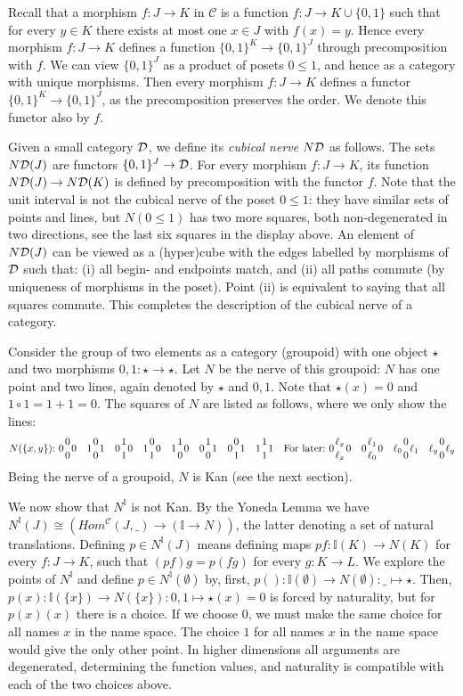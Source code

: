 \documentclass[10pt,a4paper]{article}
\newcommand{\CC}{{\mathcal C}}
\newcommand{\set}[1]{\{#1\}}
\newcommand{\interval}{\mathbb{I}}
\newcommand{\DD}{{\cal D}}
\newcommand{\ND}{N\DD}
\begin{document}
Recall that a morphism $f:J\to K$ in $\CC$ is a function $f:J\to
K\cup\set{0,1}$ such that for every $y\in K$ there exists at most one
$x\in J$ with $f(x)=y$.  Hence every morphism $f:J\to K$ defines a
function $\set{0,1}^K \to \set{0,1}^J$ through precomposition with
$f$.  We can view $\set{0,1}^J$ as a product of posets $0\leq1$, and
hence as a category with unique morphisms.  Then every morphism
$f:J\to K$ defines a functor $\set{0,1}^K \to \set{0,1}^J$, as the
precomposition preserves the order.  We denote this functor also by
$f$.

Given a small category $\DD$, we define its \emph{cubical nerve} $\ND$
as follows. The sets $\ND(J)$ are functors $\set{0,1}^J \to\DD$.  For
every morphism $f:J\to K$, its function $\ND(J)\to\ND(K)$ is defined
by precomposition with the functor $f$.  Note that the unit interval
is not the cubical nerve of the poset $0\leq1$: they have similar sets
of points and lines, but $N(0\leq1)$ has two more squares, both
non-degenerated in two directions, see the last six squares in the
display above.  An element of $\ND(J)$ can be viewed as a (hyper)cube
with the edges labelled by morphisms of $\DD$ such that: (i) all
begin- and endpoints match, and (ii) all paths commute (by uniqueness
of morphisms in the poset).  Point (ii) is equivalent to saying that
all squares commute.  This completes the description of the cubical
nerve of a category.

Consider the group of two elements as a category (groupoid) with one
object $\star$ and two morphisms $0,1:\star\to\star$.  Let $N$ be the
nerve of this groupoid: $N$ has one point and two lines, again denoted
by $\star$ and $0,1$.  Note that $\star(x) = 0$ and $1\circ 1 =
1+1=0$.  The squares of $N$ are listed as follows, where we only show
the lines:
\[
\def\ol{{1 \atop 0}}
\def\oo{{0 \atop 0}}
\def\lo{{0 \atop 1}}
\def\ll{{1 \atop 1}}
N(\set{x,y}){:}~
0\oo0 \quad 1\oo1 \quad 0\ll0 \quad 1\lo0 \quad 1\ol0 \quad 0\ol1 \quad 0\lo1 \quad 1\ll1
\quad\mbox{For later:}~0{\ell_x \atop \ell_x}0 \quad 0{\ell_1 \atop \ell_0}0
\quad \ell_0{0 \atop 0}\ell_1 \quad \ell_y{0 \atop 0}\ell_y\]
Being the nerve of a groupoid, $N$ is Kan (see the next section).

We now show that $N^\interval$ is not Kan. By the Yoneda Lemma we have
$N^\interval(J)\cong (Hom^{\CC}(J,\_)\to (\interval\to N))$, the
latter denoting a set of natural translations.  Defining $p\in
N^\interval(J)$ means defining maps $pf:\interval(K)\to N(K)$ for
every $f:J\to K$, such that $(pf)g=p(fg)$ for every $g:K\to L$. We
explore the points of $N^\interval$ and define $p\in
N^\interval(\emptyset)$ by, first, $p():\interval(\emptyset)\to
N(\emptyset):\_\mapsto\star$.  Then, $p(x):\interval(\set{x})\to
N(\set{x}): 0,1 \mapsto\star(x)=0$ is forced by naturality, but for
$p(x)(x)$ there is a choice. If we choose $0$, we must make the same
choice for all names $x$ in the name space.  The choice $1$ for all
names $x$ in the name space would give the only other point. In higher
dimensions all arguments are degenerated, determining the function
values, and naturality is compatible with each of the two choices
above.
\end{document}

